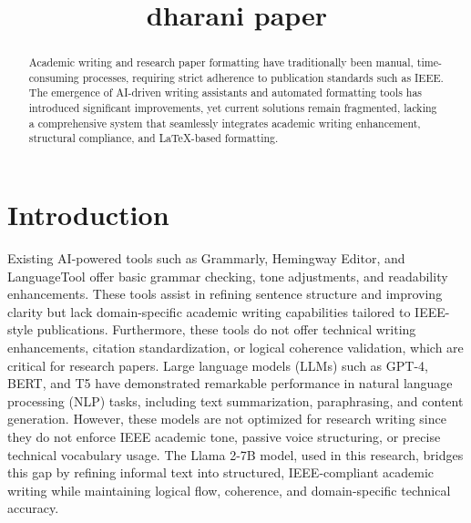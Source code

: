 \documentclass[conference]{IEEEtran}
\title{dharani paper}
\author{

  
    
      \IEEEauthorblockN{krithy}
      \IEEEauthorblockA{
        SLIIT \\
        KRITHU@gmail.com
      }
    
      \IEEEauthorblockN{shandeep}
      \IEEEauthorblockA{
        SLIIT \\
        shandeep@gmail.com
      }
    
    
    
  

}
\begin{document}
\maketitle

\begin{abstract}
Academic writing and research paper formatting have traditionally been manual, time-consuming processes, requiring strict adherence to publication standards such as IEEE. The emergence of AI-driven writing assistants and automated formatting tools has introduced significant improvements, yet current solutions remain fragmented, lacking a comprehensive system that seamlessly integrates academic writing enhancement, structural compliance, and LaTeX-based formatting.
\end{abstract}




  \section{Introduction}
  Existing AI-powered tools such as Grammarly, Hemingway Editor, and LanguageTool offer basic grammar checking, tone adjustments, and readability enhancements. These tools assist in refining sentence structure and improving clarity but lack domain-specific academic writing capabilities tailored to IEEE-style publications. Furthermore, these tools do not offer technical writing enhancements, citation standardization, or logical coherence validation, which are critical for research papers.
Large language models (LLMs) such as GPT-4, BERT, and T5 have demonstrated remarkable performance in natural language processing (NLP) tasks, including text summarization, paraphrasing, and content generation. However, these models are not optimized for research writing since they do not enforce IEEE academic tone, passive voice structuring, or precise technical vocabulary usage. The Llama 2-7B model, used in this research, bridges this gap by refining informal text into structured, IEEE-compliant academic writing while maintaining logical flow, coherence, and domain-specific technical accuracy.

  
    
\end{document}
